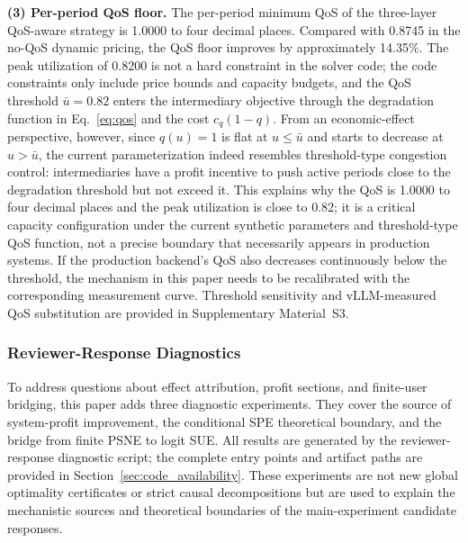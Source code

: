\documentclass[11pt,a4paper]{article}
\begin{document}
\textbf{(3) Per-period QoS floor.} The per-period minimum QoS of the three-layer QoS-aware strategy is 1.0000 to four decimal places. Compared with 0.8745 in the no-QoS dynamic pricing, the QoS floor improves by approximately 14.35\%. The peak utilization of 0.8200 is not a hard constraint in the solver code; the code constraints only include price bounds and capacity budgets, and the QoS threshold $\bar u=0.82$ enters the intermediary objective through the degradation function in Eq.~\eqref{eq:qos} and the cost $c_q(1-q)$. From an economic-effect perspective, however, since $q(u)=1$ is flat at $u\le\bar u$ and starts to decrease at $u>\bar u$, the current parameterization indeed resembles threshold-type congestion control: intermediaries have a profit incentive to push active periods close to the degradation threshold but not exceed it. This explains why the QoS is 1.0000 to four decimal places and the peak utilization is close to 0.82; it is a critical capacity configuration under the current synthetic parameters and threshold-type QoS function, not a precise boundary that necessarily appears in production systems. If the production backend's QoS also decreases continuously below the threshold, the mechanism in this paper needs to be recalibrated with the corresponding measurement curve. Threshold sensitivity and vLLM-measured QoS substitution are provided in Supplementary Material~S3.

\subsubsection{Reviewer-Response Diagnostics}
\label{sec:reviewer_response_diagnostics}

To address questions about effect attribution, profit sections, and finite-user bridging, this paper adds three diagnostic experiments. They cover the source of system-profit improvement, the conditional SPE theoretical boundary, and the bridge from finite PSNE to logit SUE. All results are generated by the reviewer-response diagnostic script; the complete entry points and artifact paths are provided in Section~\ref{sec:code_availability}. These experiments are not new global optimality certificates or strict causal decompositions but are used to explain the mechanistic sources and theoretical boundaries of the main-experiment candidate responses.
\end{document}
